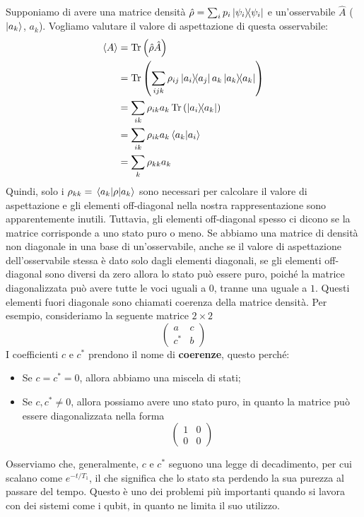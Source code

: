 \noindent Supponiamo di avere una matrice densità $\hat \rho=\sum_i p_i \op{\psi_i}{\psi_i}$ e un'osservabile $\hat A$ ($\ket {a_k}$, $a_k$). Vogliamo valutare il valore di aspettazione di questa osservabile:
\begin{equation*}
    \begin{aligned}
        \expval{A} &= \Tr\left(\hat\rho \hat A\right) \\
                   &= \Tr\left(\sum_{ijk} \rho_{ij}\op{a_i}{a_j}a_k\op{a_k}{a_k}\right) \\
                   &= \sum_{ik}\rho_{ik}a_k\Tr\left(\op{a_i}{a_k}\right) \\
                   &= \sum_{ik}\rho_{ik}a_k\ip{a_k}{a_i} \\
                   &= \sum_k\rho_{kk}a_k
    \end{aligned}
\end{equation*}
Quindi, solo i $\rho_{kk}=\mel{a_k}{\rho}{a_k}$ sono necessari per calcolare il valore di aspettazione e gli elementi off-diagonal nella nostra rappresentazione sono apparentemente inutili. Tuttavia, gli elementi off-diagonal spesso ci dicono se la matrice corrisponde a uno stato puro o meno. Se abbiamo una matrice di densità non diagonale in una base di un'osservabile, anche se il valore di aspettazione dell'osservabile stessa è dato solo dagli elementi diagonali, se gli elementi off-diagonal sono diversi da zero allora lo stato può essere puro, poiché la matrice diagonalizzata può avere tutte le voci uguali a $0$, tranne una uguale a $1$. Questi elementi fuori diagonale sono chiamati coerenza della matrice densità. Per esempio, consideriamo la seguente matrice $2\times 2$
\begin{equation*}
    \begin{pmatrix}
        a & c \\
        c^* & b
    \end{pmatrix}
\end{equation*}
I coefficienti $c$ e $c^*$ prendono il nome di \textbf{coerenze}, questo perché:
\begin{itemize}
    \item Se $c=c^*=0$, allora abbiamo una miscela di stati;
    \item Se $c,c^*\neq 0$, allora possiamo avere uno stato puro, in quanto la matrice può essere diagonalizzata nella forma
        \begin{equation*}
            \begin{pmatrix}
                1 & 0 \\
                0 & 0
            \end{pmatrix}
        \end{equation*}
\end{itemize}
Osserviamo che, generalmente, $c$ e $c^*$ seguono una legge di decadimento, per cui scalano come $e^{-t/T_1}$, il che significa che lo stato sta perdendo la sua purezza al passare del tempo. Questo è uno dei problemi più importanti quando si lavora con dei sistemi come i qubit, in quanto ne limita il suo utilizzo.